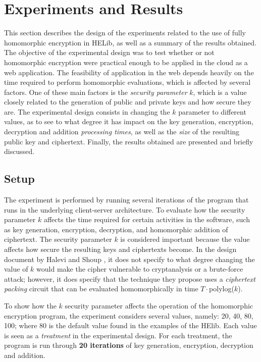 \chapter{Experiments and Results}
\label{results}

This section describes the design of the experiments related to the use of fully homomorphic encryption in HELib, as well as a summary of the results obtained. The objective of the experimental design was to test whether or not homomorphic encryption were practical enough to be applied in the cloud as a web application. The feasibility of application in the web depends heavily on the time required to perform homomorphic evaluations, which is affected by several factors. One of these main factors is the \emph{security parameter} $k$, which is a value closely related to the generation of public and private keys and how secure they are. The experimental design consists in changing the $k$ parameter to different values, as to see to what degree it has impact on the key generation, encryption, decryption and addition \emph{processing times}, as well as the \emph{size} of the resulting public key and ciphertext. Finally, the results obtained are presented and briefly discussed. 

\section{Setup}

The experiment is performed by running several iterations of the program that runs in the underlying client-server architecture. To evaluate how the security parameter $k$ affects the time required for certain activities in the software, such as key generation, encryption, decryption, and homomorphic addition of ciphertext. The security parameter $k$ is considered important because the value affects how secure the resulting keys and ciphertexts become. In the design document by Halevi and Shoup \cite{cryptoeprint:2014:106}, it does not specify to what degree changing the value of $k$ would make the cipher vulnerable to cryptanalysis or a brute-force attack; however, it does specify that the technique they propose uses a \emph{ciphertext packing} circuit that can be evaluated homomorphically in time $T \cdot $polylog($k$).

To show how the $k$ security parameter affects the operation of the homomorphic encryption program, the experiment considers several values, namely: 20, 40, 80, 100; where 80 is the default value found in the examples of the HElib. Each value is seen as a \emph{treatment} in the experimental design. For each treatment, the program is run through \textbf{20 iterations} of key generation, encryption, decryption and addition. 

